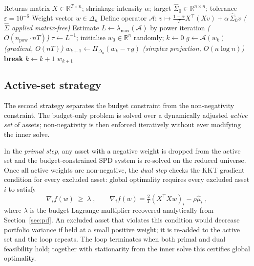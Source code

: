\begin{algorithm}[ht]
\caption{Simplex-projection solver (proximal gradient, matrix-free)}\label{alg:proximal}
\begin{algorithmic}[1]
\Require Returns matrix $X \in \mathbb{R}^{T\times n}$;\; shrinkage intensity $\alpha$;\;
         target $\hat\Sigma_0 \in \mathbb{R}^{n\times n}$;\; tolerance $\varepsilon = 10^{-6}$
\Ensure Weight vector $w \in \Delta_n$
\State Define operator $\mathcal{A}$:\; $v \mapsto \tfrac{1-\alpha}{T}X^\top(Xv) + \alpha\,\hat\Sigma_0 v$
  \hfill\textit{($\hat\Sigma$ applied matrix-free)}
\State Estimate $L \leftarrow \lambda_{\max}(\mathcal{A})$ by power iteration
  \hfill\textit{($O(n_{\mathrm{pow}}\cdot nT)$)}
\State $\tau \leftarrow L^{-1}$;\; initialise $w_0 \in \mathbb{R}^n$ randomly;\; $k \leftarrow 0$
\Loop
  \State $g \leftarrow \mathcal{A}(w_k)$
    \hfill\textit{(gradient, $O(nT)$)}
  \State $w_{k+1} \leftarrow \Pi_{\Delta_n}(w_k - \tau\,g)$
    \hfill\textit{(simplex projection, $O(n\log n)$)}
    \textbf{ break}
  \EndIf
  \State $k \leftarrow k + 1$
\EndLoop
\State \Return $w_{k+1}$
\end{algorithmic}
\end{algorithm}

\subsection{Active-set strategy}\label{subsec:activeSet}
The second strategy separates the budget constraint from the non-negativity constraint.
The budget-only problem is solved over a dynamically adjusted \emph{active set} of
assets; non-negativity is then enforced iteratively without ever modifying the inner
solve.

In the \emph{primal step}, any asset with a negative weight is dropped from the active
set and the budget-constrained SPD system is re-solved on the reduced universe. Once
all active weights are non-negative, the \emph{dual step} checks the KKT gradient
condition for every excluded asset: global optimality requires every excluded asset $i$
to satisfy
\[
  \nabla_i f(w) \;\geq\; \lambda\;,
  \qquad
  \nabla_i f(w) = \tfrac{2}{T}(X^\top Xw)_i - \rho\hat\mu_i\;,
\]
where $\lambda$ is the budget Lagrange multiplier recovered analytically from
Section~\ref{sec:pd}. An excluded asset that violates this condition would decrease
portfolio variance if held at a small positive weight; it is re-added to the active set
and the loop repeats. The loop terminates when both primal and dual feasibility hold;
together with stationarity from the inner solve this certifies global optimality.

